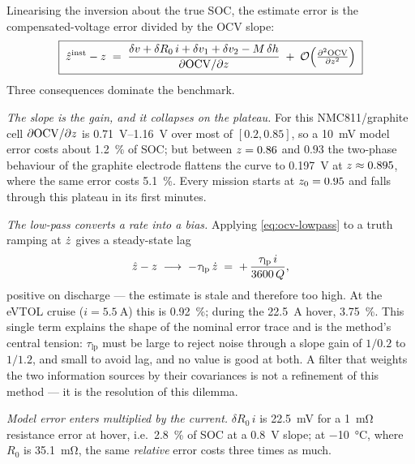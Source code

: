 Linearising the inversion about the true SOC, the estimate error is the compensated-voltage error
divided by the OCV slope:
\begin{equation}
\boxed{\;
\hat{z}^{\text{inst}} - z \;=\;
\frac{\delta v + \delta R_0\, i + \delta v_1 + \delta v_2 - M\,\delta h}{\partial\mathrm{OCV}/\partial z}
\;+\;\mathcal{O}\!\left(\tfrac{\partial^2\mathrm{OCV}}{\partial z^2}\right) \; }
\label{eq:ocv-error}
\end{equation}
Three consequences dominate the benchmark.

\emph{The slope is the gain, and it collapses on the plateau.} For this NMC811/graphite cell
$\partial\mathrm{OCV}/\partial z$ is \SIrange{0.71}{1.16}{\volt} over most of $[0.2,0.85]$, so a
\SI{10}{\milli\volt} model error costs about \SI{1.2}{\percent} of SOC; but between $z=0.86$ and
$0.93$ the two-phase behaviour of the graphite electrode flattens the curve to \SI{0.197}{\volt} at
$z\approx0.895$, where the same error costs \SI{5.1}{\percent}. Every mission starts at
$z_0=0.95$ and falls through this plateau in its first minutes.

\emph{The low-pass converts a rate into a bias.} Applying \eqref{eq:ocv-lowpass} to a truth ramping
at $\dot{z}$ gives a steady-state lag
\begin{equation}
\hat{z} - z \;\longrightarrow\; -\tau_{\text{lp}}\,\dot{z} \;=\; +\,\frac{\tau_{\text{lp}}\,i}{3600\,Q},
\label{eq:ocv-lag}
\end{equation}
positive on discharge --- the estimate is stale and therefore too high. At the eVTOL cruise
($i=\SI{5.5}{\ampere}$) this is \SI{0.92}{\percent}; during the \SI{22.5}{\ampere} hover,
\SI{3.75}{\percent}. This single term explains the shape of the nominal error trace and is the
method's central tension: $\tau_{\text{lp}}$ must be large to reject noise through a slope gain of
$1/0.2$ to $1/1.2$, and small to avoid lag, and no value is good at both. A filter that weights the
two information sources by their covariances is not a refinement of this method --- it is the
resolution of this dilemma.

\emph{Model error enters multiplied by the current.} $\delta R_0\,i$ is \SI{22.5}{\milli\volt} for a
\SI{1}{\milli\ohm} resistance error at hover, i.e.\ \SI{2.8}{\percent} of SOC at a \SI{0.8}{\volt}
slope; at \SI{-10}{\celsius}, where $R_0$ is \SI{35.1}{\milli\ohm}, the same \emph{relative} error
costs three times as much.

